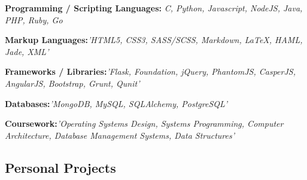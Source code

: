 \documentclass[12pt,a4paper,sans]{moderncv}        %
\begin{document}
\begin{itemize}

\item{\textbf{Programming / Scripting Languages:} \textit{C, Python, Javascript, NodeJS, Java, PHP, Ruby, Go}

\small{}}

\vspace{6pt}

\item{\textbf{Markup Languages:}\textit{'HTML5, CSS3, SASS/SCSS, Markdown, LaTeX, HAML, Jade, XML'}

\vspace{3pt}

\small{}}

\vspace{6pt}

\item{\textbf{Frameworks / Libraries:}\textit{'Flask, Foundation, jQuery, PhantomJS, CasperJS, AngularJS, Bootstrap, Grunt, Qunit'}

\vspace{3pt}
\item{\textbf{Databases:}\textit{'MongoDB, MySQL, SQLAlchemy, PostgreSQL'} }

\vspace{3pt}

\small{}}

\vspace{6pt}

\item{\textbf{Coursework:}\textit{'Operating Systems Design, Systems Programming, Computer Architecture, Database Management Systems, Data Structures'} }

\vspace{3pt}

\small{}

\vspace{6pt}

\end{itemize}

\vspace{5pt}

\subsection{Personal Projects}

\vspace{5pt}
\end{document}
